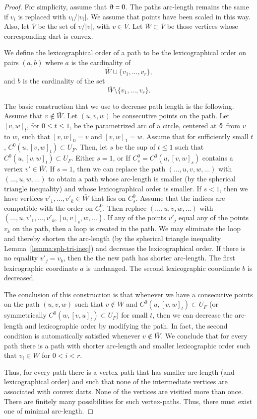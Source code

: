 \begin{proof}  For simplicity, assume that $\orgn=0$.
The paths arc-length remains the same if $v_i$ is replaced with $v_i/|v_i|$.
We assume that points have been scaled in this way.  Also, let $\bar V$ be
the set of $v/|v|$, with $v\in V$.  Let $\bar W\subset \bar V$ be those
vertices whose corresponding dart is convex.

We define the lexicographical order of a path to be the lexicographical order on
pairs
   $(a,b)$
where $a$ is the cardinality of
   $$\bar W \cup \{v_1,\ldots,v_r\},$$
and $b$ is the cardinality of the set
   $$\bar W \setminus \{v_1,\ldots,v_r\}.$$

The basic construction that we use to decrease path length is the following.
Assume that $v\not\in \bar W$.
Let $(u,v,w)$ be consecutive points on the path.  Let $[v,w]_t$,
for $0\le t\le 1$, be the parametrized arc
of a circle, centered at $\orgn$ from $v$ to $w$, such that $[v,w]_0=v$ and $[v,w]_1=w$.
Assume that for sufficiently small $t$, $C^0(u,[v,w]_t)\subset U_F$.
Then, let $s$ be the sup of $t\le 1$ such that $C^0(u,[v,w]_t)\subset U_F$.
Either $s=1$, or 
If $C^0_s=C^0(u,[v,w]_s)$ contains a vertex $v'\in \bar W$.
If $s=1$, then we can replace the path
$(\ldots,u,v,w,\ldots)$ with $(\ldots,u,w,\ldots)$ to obtain a path whose
arc-length is smaller (by the spherical triangle inequality) and whose 
lexicographical order is smaller.
If $s<1$, then we have vertices $v'_1,\ldots,v'_k\in \bar W$ that lies on $C^0_s$.
Assume that the indices are compatible with the order on $C^0_s$.
Then replace $(\ldots,u,v,w,\ldots)$ with
$(\ldots,u,v'_1,\ldots,v'_k,[u,v]_s,w,\ldots)$.  If any of the points $v'_j$
equal any of the points $v_k$ on the path, then a loop is created in the path.
We may eliminate the loop and thereby shorten the arc-length
(by the spherical triangle inequality Lemma~\ref{lemma:sph-tri-ineq}) and decrease the 
lexicographical order.  If there is no equality $v'_j=v_k$, then the the new
path has shorter arc-length.  The first lexicographic coordinate $a$ is unchanged.
The second lexicographic coordinate $b$ is decreased.

The conclusion of this construction is that whenever we have a consecutive
points on the path $(u,v,w)$ such that $v\not\in \bar W$ and $C^0(u,[v,w]_t)\subset U_F$ (or
symmetrically $C^0(w,[v,u]_t)\subset U_F$) for small $t$, then we can decrease
the arc-length and lexicographic order by modifying the path.
In fact, the second condition is automatically satisfied whenever $v\not\in \bar W$.
We conclude that for every path there is a path with shorter arc-length and
smaller lexicographic order such that
$v_i\in W$ for $0 < i < r$.  

Thus, for every path there is a vertex path that has smaller arc-length 
(and lexicographical order)
and
such that none of the intermediate vertices are associated with  convex darts.
None of the vertices are visitied more than once.
There are finitely many possibilities for such vertex-paths.  Thus, there
must exist one of minimal arc-length.
\end{proof}


